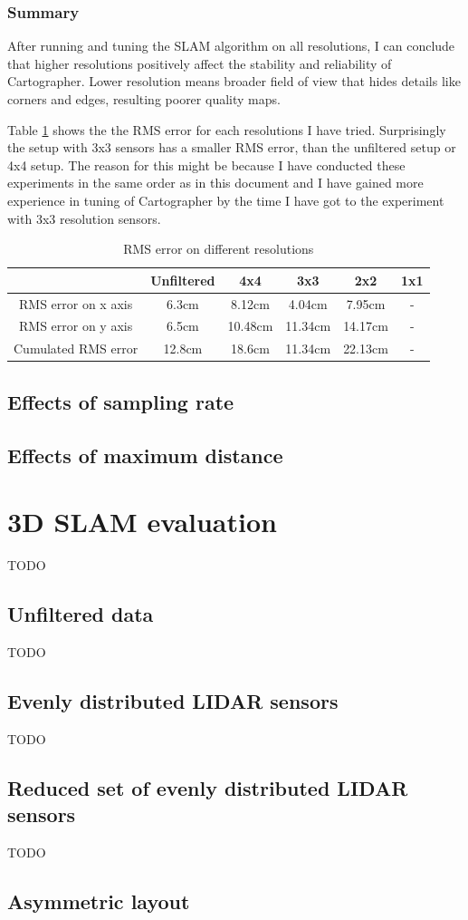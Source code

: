 \subsubsection{Summary}
After running and tuning the SLAM algorithm on all resolutions, I can conclude that higher resolutions
positively affect the stability and reliability of Cartographer. Lower resolution means broader field of 
view that hides details like corners and edges, resulting poorer quality maps.

Table \ref{tab:error_on_different_resolutions} shows the the RMS error for each resolutions I have tried.
Surprisingly the setup with 3x3 sensors has a smaller RMS error, than the unfiltered setup or 4x4 setup.
The reason for this might be because I have conducted these experiments in the same order as in this document
and I have gained more experience in tuning of Cartographer by the time I have got to the experiment with 3x3
resolution sensors. 

\begin{table}[ht]
	\centering
	\begin{tabular}{||c c c c c c||}
		\hline
                            & Unfiltered    & 4x4     & 3x3     & 2x2     & 1x1 \\
		\hline\hline
        RMS error on x axis & 6.3cm         & 8.12cm  & 4.04cm  & 7.95cm  & -\\
        \hline
        RMS error on y axis & 6.5cm         & 10.48cm & 11.34cm & 14.17cm & -\\
		\hline
        Cumulated RMS error & 12.8cm        & 18.6cm  & 11.34cm & 22.13cm & -\\
		\hline
	\end{tabular}
	\caption{RMS error on different resolutions}
	\label{tab:error_on_different_resolutions}
\end{table}


\subsection{Effects of sampling rate}

\subsection{Effects of maximum distance}



\section{3D SLAM evaluation}
TODO
\subsection{Unfiltered data}
TODO
\subsection{Evenly distributed LIDAR sensors}
TODO
\subsection{Reduced set of evenly distributed LIDAR sensors}
TODO
\subsection{Asymmetric layout}
